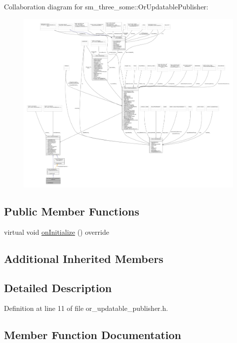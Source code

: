 Collaboration diagram for sm\+\_\+three\+\_\+some\+:\+:Or\+Updatable\+Publisher\+:
\nopagebreak
\begin{figure}[H]
\begin{center}
\leavevmode
\includegraphics[width=350pt]{classsm__three__some_1_1OrUpdatablePublisher__coll__graph}
\end{center}
\end{figure}
\subsection*{Public Member Functions}
\begin{DoxyCompactItemize}
\item 
virtual void \hyperlink{classsm__three__some_1_1OrUpdatablePublisher_aecda3521d565c139c75080f12e7045e0}{on\+Initialize} () override
\end{DoxyCompactItemize}
\subsection*{Additional Inherited Members}


\subsection{Detailed Description}


Definition at line 11 of file or\+\_\+updatable\+\_\+publisher.\+h.



\subsection{Member Function Documentation}
\mbox{\label{classsm__three__some_1_1OrUpdatablePublisher_aecda3521d565c139c75080f12e7045e0}} 
